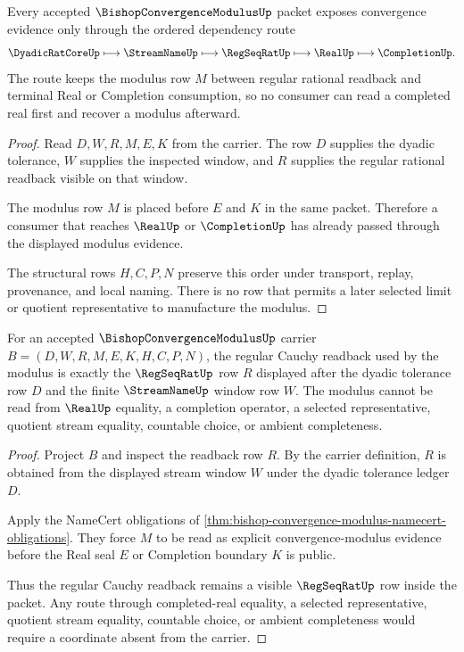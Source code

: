 \begin{theorem}
\label{thm:bishop-convergence-modulus-dependency-route}
Every accepted $\BishopConvergenceModulusUp$ packet exposes convergence evidence only through the ordered dependency route
$$
\DyadicRatCoreUp\longmapsto\StreamNameUp\longmapsto\RegSeqRatUp\longmapsto\RealUp\longmapsto\CompletionUp .
$$
The route keeps the modulus row $M$ between regular rational readback and terminal Real or Completion consumption, so no consumer can read a completed real first and recover a modulus afterward.
\end{theorem}
\begin{proof}
Read $D,W,R,M,E,K$ from the carrier. The row $D$ supplies the dyadic tolerance, $W$ supplies the inspected window, and $R$ supplies the regular rational readback visible on that window.

The modulus row $M$ is placed before $E$ and $K$ in the same packet. Therefore a consumer that reaches $\RealUp$ or $\CompletionUp$ has already passed through the displayed modulus evidence.

The structural rows $H,C,P,N$ preserve this order under transport, replay, provenance, and local naming. There is no row that permits a later selected limit or quotient representative to manufacture the modulus.
\end{proof}

\begin{theorem}
\label{thm:bishop-convergence-modulus-regular-cauchy-readback}
For an accepted $\BishopConvergenceModulusUp$ carrier $B=(D,W,R,M,E,K,H,C,P,N)$, the regular Cauchy readback used by the modulus is exactly the $\RegSeqRatUp$ row $R$ displayed after the dyadic tolerance row $D$ and the finite $\StreamNameUp$ window row $W$. The modulus cannot be read from $\RealUp$ equality, a completion operator, a selected representative, quotient stream equality, countable choice, or ambient completeness.
\end{theorem}
\begin{proof}
Project $B$ and inspect the readback row $R$. By the carrier definition, $R$ is obtained from the displayed stream window $W$ under the dyadic tolerance ledger $D$.

Apply the NameCert obligations of \autoref{thm:bishop-convergence-modulus-namecert-obligations}. They force $M$ to be read as explicit convergence-modulus evidence before the Real seal $E$ or Completion boundary $K$ is public.

Thus the regular Cauchy readback remains a visible $\RegSeqRatUp$ row inside the packet. Any route through completed-real equality, a selected representative, quotient stream equality, countable choice, or ambient completeness would require a coordinate absent from the carrier.
\end{proof}

